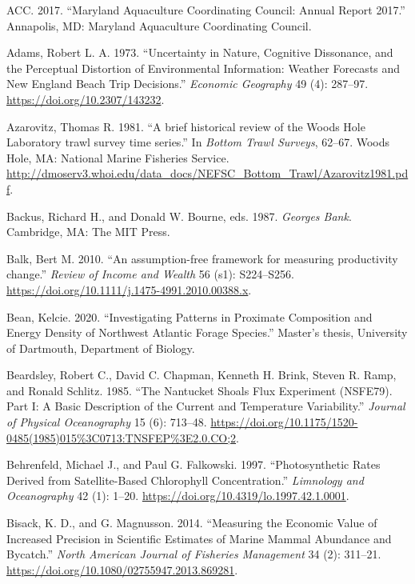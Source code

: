 \documentclass[
]{book}
\newlength{\cslhangindent}
\newenvironment{cslreferences}%
  {\setlength{\parindent}{0pt}%
  \everypar{\setlength{\hangindent}{\cslhangindent}}\ignorespaces}%
  {\par}
\begin{document}
\hypertarget{refs}{}
\begin{cslreferences}
\leavevmode\hypertarget{ref-ACC2017}{}%
ACC. 2017. ``Maryland Aquaculture Coordinating Council: Annual Report 2017.'' Annapolis, MD: Maryland Aquaculture Coordinating Council.

\leavevmode\hypertarget{ref-adams_uncertainty_1973}{}%
Adams, Robert L. A. 1973. ``Uncertainty in Nature, Cognitive Dissonance, and the Perceptual Distortion of Environmental Information: Weather Forecasts and New England Beach Trip Decisions.'' \emph{Economic Geography} 49 (4): 287--97. \url{https://doi.org/10.2307/143232}.

\leavevmode\hypertarget{ref-Azarovitz1981}{}%
Azarovitz, Thomas R. 1981. ``A brief historical review of the Woods Hole Laboratory trawl survey time series.'' In \emph{Bottom Trawl Surveys}, 62--67. Woods Hole, MA: National Marine Fisheries Service. \url{http://dmoserv3.whoi.edu/data_docs/NEFSC_Bottom_Trawl/Azarovitz1981.pdf}.

\leavevmode\hypertarget{ref-backus_georges_1987}{}%
Backus, Richard H., and Donald W. Bourne, eds. 1987. \emph{Georges Bank}. Cambridge, MA: The MIT Press.

\leavevmode\hypertarget{ref-Balk2010}{}%
Balk, Bert M. 2010. ``An assumption-free framework for measuring productivity change.'' \emph{Review of Income and Wealth} 56 (s1): S224--S256. \url{https://doi.org/10.1111/j.1475-4991.2010.00388.x}.

\leavevmode\hypertarget{ref-Bean2020}{}%
Bean, Kelcie. 2020. ``Investigating Patterns in Proximate Composition and Energy Density of Northwest Atlantic Forage Species.'' Master's thesis, University of Dartmouth, Department of Biology.

\leavevmode\hypertarget{ref-beardsley_nantucket_1985}{}%
Beardsley, Robert C., David C. Chapman, Kenneth H. Brink, Steven R. Ramp, and Ronald Schlitz. 1985. ``The Nantucket Shoals Flux Experiment (NSFE79). Part I: A Basic Description of the Current and Temperature Variability.'' \emph{Journal of Physical Oceanography} 15 (6): 713--48. \url{https://doi.org/10.1175/1520-0485(1985)015\%3C0713:TNSFEP\%3E2.0.CO;2}.

\leavevmode\hypertarget{ref-SOE1}{}%
Behrenfeld, Michael J., and Paul G. Falkowski. 1997. ``Photosynthetic Rates Derived from Satellite-Based Chlorophyll Concentration.'' \emph{Limnology and Oceanography} 42 (1): 1--20. \url{https://doi.org/10.4319/lo.1997.42.1.0001}.

\leavevmode\hypertarget{ref-bisack_measuring_2014}{}%
Bisack, K. D., and G. Magnusson. 2014. ``Measuring the Economic Value of Increased Precision in Scientific Estimates of Marine Mammal Abundance and Bycatch.'' \emph{North American Journal of Fisheries Management} 34 (2): 311--21. \url{https://doi.org/10.1080/02755947.2013.869281}.


\end{cslreferences}
\end{document}
